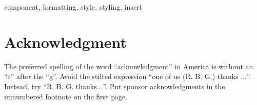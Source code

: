 \documentclass[conference]{IEEEtran}
\begin{document}
\begin{abstract}

\end{abstract}

\begin{IEEEkeywords}
component, formatting, style, styling, insert
\end{IEEEkeywords}








\section*{Acknowledgment}

The preferred spelling of the word ``acknowledgment'' in America is without 
an ``e'' after the ``g''. Avoid the stilted expression ``one of us (R. B. 
G.) thanks $\ldots$''. Instead, try ``R. B. G. thanks$\ldots$''. Put sponsor 
acknowledgments in the unnumbered footnote on the first page.




\end{document}
